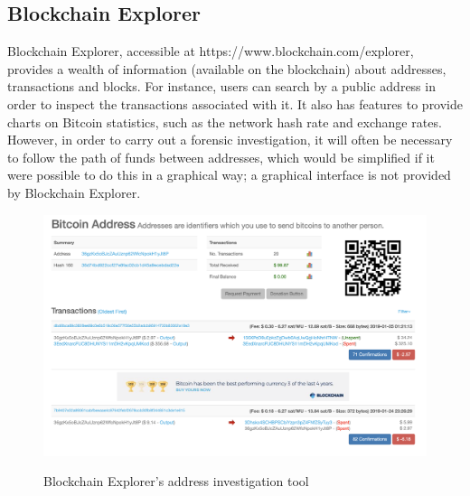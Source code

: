 \subsection{Blockchain Explorer}
Blockchain Explorer, accessible at https://www.blockchain.com/explorer, provides a wealth of information (available on the blockchain) about addresses, transactions and blocks. For instance, users can search by a public address in order to inspect the transactions associated with it. It also has features to provide charts on Bitcoin statistics, such as the network hash rate and exchange rates. However, in order to carry out a forensic investigation, it will often be necessary to follow the path of funds between addresses, which would be simplified if it were possible to do this in a graphical way; a graphical interface is not provided by Blockchain Explorer.

\begin{figure}[h!]
  \centering
  \includegraphics[width = 15cm]{./figures/chainanalysis}\\[0.5cm] 
  \caption{Blockchain Explorer's address investigation tool \protect \footnotemark}
\end{figure}

